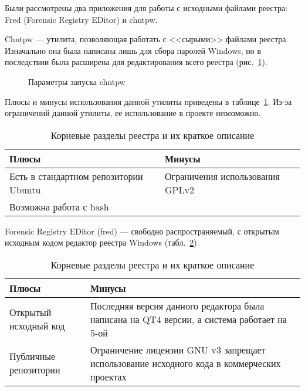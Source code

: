 Были рассмотрены два приложения для работы с исходными файлами реестра: Fred (Forensic Registry EDitor) и chntpw.


Chntpw --- утилита, позволяющая работать с <<сырыми>> файлами реестра. Изначально она была написана лишь для сбора паролей Windows, но в последствии была расширена для редактирования всего реестра (рис.~\ref{chntpw:chntpw}).

\begin{figure}[ht]                                %
\caption{Параметры запуска chntpw}
\label{chntpw:chntpw}
\end{figure}


Плюсы и минусы использования данной утилиты приведены в таблице~\ref{tab:pluses}. Из-за ограничений данной утилиты, ее использование в проекте невозможно.

\begin{table}[ht]
\caption{Корневые разделы реестра и их краткое описание}
\label{tab:pluses}
\begin{center}
\begin{tabular}{|p{8cm}|p{9cm}|}
\hline
Плюсы & Минусы \\
\hline
Есть в стандартном репозитории Ubuntu & Ограничения использования GPLv2 \\
Возможна работа с bash &  \\
\hline
\end{tabular}
\end{center}
\end{table}

Forensic Registry EDitor (fred) --- свободно распространяемый, с открытым исходным кодом редактор реестра Windows (табл.~\ref{tab:fred}). 

\begin{table}[ht]
\caption{Корневые разделы реестра и их краткое описание}
\label{tab:fred}
\begin{center}
\begin{tabular}{|p{8cm}|p{9cm}|}
\hline
Плюсы & Минусы \\
\hline
Открытый исходный код & Последняя версия данного редактора была написана на QT4 версии, а система работает на 5-ой \\
Публичные репозитории & Ограничение лицензии GNU v3 запрещает использование исходного кода в коммерческих проектах \\
\hline
\end{tabular}
\end{center}
\end{table}

